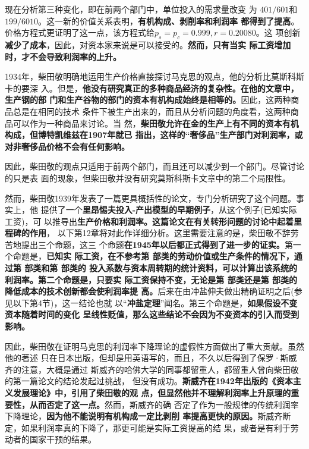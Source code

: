 现在分析第三种变化，即在前两个部门中，单位投入的需求量改变
为 $401/601$和$199/6010$。这一新的价值关系表明，\textbf{有机构成、剥削率和利润率
  都得到了提高}。价格方程式更证明了这一点，该方程式给$p_s=p_c=0.999, r=0.20080$。这
项创新\textbf{减少了成本}，因此，对资本家来说是可以接受的。\textbf{然而，只有当实
  际工资增加时，才不会导致利润率的上升。}

1934年，柴田敬明确地运用生产价格直接探讨马克思的观点，他的分析比莫斯科斯卡的要深
入。但是，\textbf{他没有研究真正的多种商品经济的复杂性。在他的文章中，生产钢的部
  门和生产谷物的部门的资本有机构成始终是相等的。}因此，这两种商品总是在相同的技术
条件下被生产出来的，而且从分析问题的角度看，这两种商品可以作为一种商品来讨论。当
然，\textbf{柴田敬允许在金的生产上有不同的资本有机构成，但博特凯维兹在1907年就已
  指出，这样的“奢侈品”生产部门对利润率，或对非奢侈品价格不会有任何影响。}

因此，柴田敬的观点只适用于前两个部门，而且还可以减少到一个部门。尽管讨论的只是表
面的现象，但柴田敬并没有研究莫斯科斯卡文章中的第二个局限性。

然而，柴田敬1939年发表了一篇更具概括性的论文，专门分析研究了这个问题。事实上，他
提供了一个\textbf{里昂惕夫投入-产出模型的早期例子}，从这个例子(已知实际工资)，可
以推导出\textbf{生产价格和利润率。这篇论文在有关转形问题的讨论中起着里程碑的作用}，
以下第12章将对此作详细分析。这里需要注意的是，柴田敬不辞劳苦地提出三个命题，这三
个命题\textbf{在1945年以后都正式得到了进一步的证实。}第一个命题是，\textbf{已知实
  际工资，在不参考第 部类的劳动价值或生产条件的情况下，通过第 部类和第 部类的
  投入系数与资本周转期的统计资料，可以计算出该系统的利润率。第二个命题是，只要实
  际工资保持不变，无论是第 部类还是第 部类的降低成本的技术创新都会使利润率提
  高。}后来在由冲盐伸夫做出精确证明之后(参见以下第4节)，这一结论也就
以“\textbf{冲盐定理}”闻名。第三个命题是，\textbf{如果假设不变资本随着时间的变化
  呈线性贬值，那么这些结论不会因为不变资本的引入而受到影响。}

因此，柴田敬在证明马克思的利润率下降理论的虚假性方面做出了重大贡献。虽然他的著述
只在日本出版，但却是用英语写的，而且，不久以后得到了保罗·斯威齐的注意，大概是通过
斯威齐的哈佛大学的同事都留重人，都留重人曾向柴田敬的第一篇论文的结论发起过挑战，
但没有成功。\textbf{斯威齐在1942年出版的《资本主义发展理论》中，引用了柴田敬的观
  点，但显然他并不理解利润率上升原理的重要性，从而否定了这一点。}然而，斯威齐的确
否定了作为一般规律的传统利润率下降理论，\textbf{因为他不能说明有机构成一定比剥削
  率提高更快的原因。}斯威齐断定，如果利润率真的下降了，那更可能是实际工资提高的结
果，或者是有利于劳动者的国家干预的结果。

